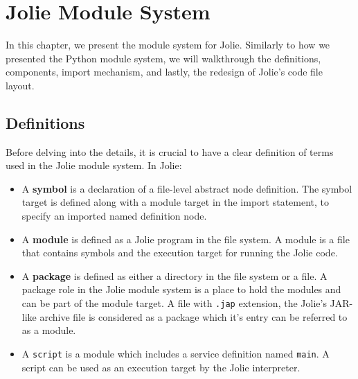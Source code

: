 \chapter{Jolie Module System}

In this chapter, we present the module system for Jolie.
Similarly to how we presented the Python module system, we will walkthrough the definitions, components, import mechanism, and lastly, the redesign of Jolie's code file layout.

\section{Definitions}

Before delving into the details, it is crucial to have a clear definition of terms used in the Jolie module system. In Jolie:

\begin{itemize}
      \item
            A \textbf{symbol} is a declaration of a file-level abstract node definition. The symbol target is defined along with a module target in the import statement, to specify an imported named definition node.
      \item
            A \textbf{module} is defined as a Jolie program in the file system. A module is a file that contains symbols and the execution target for running the Jolie code.
      \item
            A \textbf{package} is defined as either a directory in the file system or a file. A package role in the Jolie module system is a place to hold the modules and can be part of the module target. A file with \texttt{.jap} extension, the Jolie's JAR-like archive file is considered as a package which it's entry can be referred to as a module.
      \item
            A \texttt{script} is a module which includes a service definition named \texttt{main}. A script can be used as an execution target by the Jolie interpreter. 
\end{itemize}











